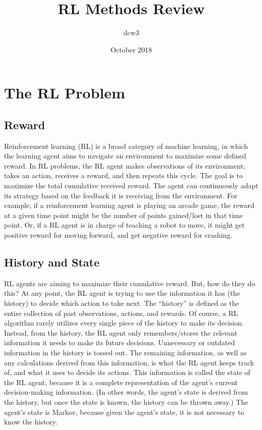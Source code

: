 \documentclass{article}
\title{RL Methods Review}
\author{dcw3}
\date{October 2018}
\begin{document}
\maketitle

\section{The RL Problem}

\subsection{Reward}

Reinforcement learning (RL) is a broad category of machine learning, in which the learning agent aims to navigate an environment to maximize some defined reward. In RL problems, the RL agent makes observations of its environment, takes an action, receives a reward, and then repeats this cycle. The goal is to maximize the total cumulative received reward. The agent can continuously adapt its strategy based on the feedback it is receiving from the environment. For example, if a reinforcement learning agent is playing an arcade game, the reward at a given time point might be the number of points gained/lost in that time point. Or, if a RL agent is in charge of teaching a robot to move, it might get positive reward for moving forward, and get negative reward for crashing.

\subsection{History and State}

RL agents are aiming to maximize their cumulative reward. But, how do they do this? At any point, the RL agent is trying to use the information it has (the history) to decide which action to take next. The “history” is defined as the entire collection of past observations, actions, and rewards. Of course, a RL algorithm rarely utilizes every single piece of the history to make its decision. Instead, from the history, the RL agent only remembers/stores the relevant information it needs to make its future decisions. Unnecessary or outdated information in the history is tossed out. The remaining information, as well as any calculations derived from this information, is what the RL agent keeps track of, and what it uses to decide its actions. This information is called the state of the RL agent, because it is a complete representation of the agent’s current decision-making information. (In other words, the agent’s state is derived from the history, but once the state is known, the history can be thrown away.) The agent’s state is Markov, because given the agent’s state, it is not necessary to know the history.
\end{document}
